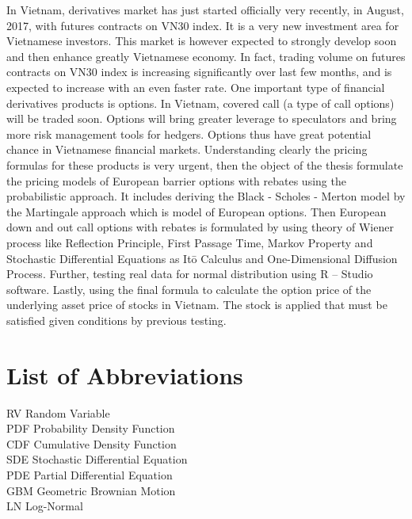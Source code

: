 \documentclass[12pt,a4paper,left=2cm,right=2cm,oneside,titlepage]{report}
\numberwithin{equation}{section}
\begin{document}
\fontsize{11pt}{20pt}\selectfont  In Vietnam, derivatives market has just started officially very recently, in August, 2017, with futures contracts on VN30 index. It is a very new investment area for Vietnamese investors. This market is however expected to strongly develop soon and then enhance greatly Vietnamese economy. In fact, trading volume on futures contracts on VN30 index is increasing significantly over last few months, and is expected to increase with an even faster rate. One important type of financial derivatives products is options. In Vietnam, covered call (a type of call options) will be traded soon. Options will bring greater leverage to speculators and bring more risk management tools for hedgers. Options thus have great potential chance in Vietnamese financial markets. Understanding clearly the pricing formulas for these products is very urgent, then the object of the thesis formulate the pricing models of European barrier options with rebates using the probabilistic approach. It includes deriving the Black - Scholes - Merton model by the Martingale approach which is model of European options. Then European down and out call options with rebates is formulated by using theory of Wiener process like Reflection Principle, First Passage Time, Markov Property and Stochastic Differential Equations as It\=o Calculus and One-Dimensional Diffusion Process. Further, testing real data for normal distribution using R – Studio software. Lastly, using the final formula to calculate the option price of the underlying asset price of stocks in Vietnam. The stock is applied that must be satisfied given conditions by previous testing. 

	\tableofcontents
	\listoffigures
	\listoftables
	
	\clearpage
	\chapter*{List of Abbreviations}
	
	RV \hspace{1cm} Random Variable\\[0.2cm]
	PDF \hspace{0.7cm} Probability Density Function\\[0.2cm]
	CDF \hspace{0.7cm} Cumulative Density Function\\[0.2cm]
	SDE \hspace{0.7cm} Stochastic Differential Equation\\[0.2cm]
	PDE \hspace{0.7cm} Partial Differential Equation\\[0.2cm]
	GBM \hspace{0.6cm} Geometric Brownian Motion\\[0.2cm]
	LN \hspace{1cm} Log-Normal
	 
\end{document}
